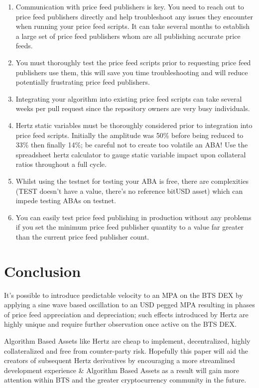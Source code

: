 \documentclass[sigconf]{acmart}
\begin{document}
\begin{enumerate}[wide, labelwidth=!, labelindent=0pt]
\item Communication with price feed publishers is key. You need to reach out to price feed publishers directly and help troubleshoot any issues they encounter when running your price feed scripts. It can take several months to establish a large set of price feed publishers whom are all publishing accurate price feeds.
\item You must thoroughly test the price feed scripts prior to requesting price feed publishers use them, this will save you time troubleshooting and will reduce potentially frustrating price feed publishers. 
\item Integrating your algorithm into existing price feed scripts can take several weeks per pull request since the repository owners are very busy individuals.
\item Hertz static variables must be thoroughly considered prior to integration into price feed scripts. Initially the amplitude was 50\% before being reduced to 33\% then finally 14\%; be careful not to create too volatile an ABA! Use the spreadsheet hertz calculator to gauge static variable impact upon collateral ratios throughout a full cycle.
\item Whilst using the testnet for testing your ABA is free, there are complexities (TEST doesn't have a value, there's no reference bitUSD asset) which can impede testing ABAs on testnet. \item You can easily test price feed publishing in production without any problems if you set the minimum price feed publisher quantity to a value far greater than the current price feed publisher count.
\end{enumerate}

\section{Conclusion}

It's possible to introduce predictable velocity to an MPA on the BTS DEX by applying a sine wave based oscillation to an USD pegged MPA resulting in phases of price feed appreciation and depreciation; such effects introduced by Hertz are highly unique and require further observation once active on the BTS DEX.

Algorithm Based Assets like Hertz are cheap to implement, decentralized, highly collateralized and free from counter-party risk. Hopefully this paper will aid the creators of subsequent Hertz derivatives by encouraging a more streamlined development experience \& Algorithm Based Assets as a result will gain more attention within BTS and the greater cryptocurrency community in the future.



\end{document}

